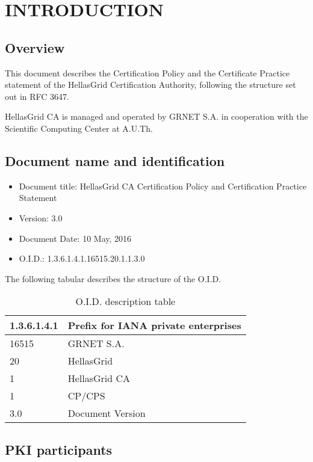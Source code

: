 
\chapter{INTRODUCTION}
\section{Overview}

This document describes the Certification Policy and the Certificate Practice statement of the HellasGrid Certification Authority, following the structure set out in RFC 3647. 

HellasGrid CA is managed and operated by GRNET S.A. in cooperation with the Scientific Computing Center at A.U.Th.

\section{Document name and identification}
\label{sec:DocumentNameAndIdentification}

\begin{itemize}
\item{Document title: HellasGrid CA Certification Policy and Certification Practice Statement}
\item{Version: $3.0$}
\item{Document Date: 10 May, 2016}
\item{O.I.D.: 1.3.6.1.4.1.16515.20.1.1.3.0}
\end{itemize}
The following tabular describes the structure of the O.I.D.

\begin{table}[hbt]
\begin{center}
\begin{tabular}{|l|l|}
\hline
1.3.6.1.4.1 & Prefix for IANA private enterprises \\
\hline
16515 & GRNET S.A. \\
\hline
20 & HellasGrid \\
\hline
1 & HellasGrid CA \\
\hline
1 & CP/CPS \\
\hline
3.0 & Document Version \\
\hline
\end{tabular}
\end{center}
\caption{O.I.D. description table}
\end{table}

\section{PKI participants}

